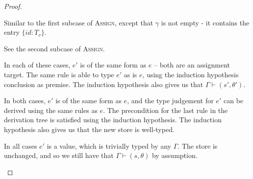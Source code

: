 \begin{proof}
  \begin{case}[AssignUndef]
	Similar to the first subcase of \textsc{Assign}, except that $\gamma$ is
	not empty - it contains the entry $\{id: T_v\}$.
  \end{case}
  \begin{case}[PropAdd]
	See the second subcase of \textsc{Assign}.
  \end{case}
  \begin{case}
	In each of these cases, $e'$ is of the same form as $e$ -- both are an
	assignment target. The same rule is able to type $e'$ as is $e$, using the
	induction hypothesis conclusion as premise. The induction hypothesis also
	gives us that $\Gamma\vdash(s',\theta')$.
  \end{case}
  \begin{case}
	In both cases, $e'$ is of the same form as $e$, and the type judgement for $e'$ 
	can be derived using the same rules as $e$. The precondition for the last 
	rule in the derivation tree is satisfied using the induction hypothesis.
	The induction hypothesis also gives us that the new store is well-typed.
  \end{case}
  \begin{case}
	In all cases $e'$ is a value, which is trivially typed by any $\Gamma$.
	The store is unchanged, and so we still have that $\Gamma\vdash(s,\theta)$
	by assumption.
  \end{case}
\end{proof}





